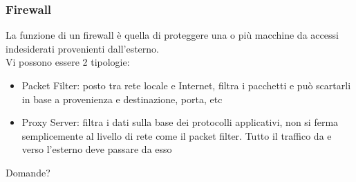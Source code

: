 \documentclass[aspectratio=169]{beamer}
\begin{document}
    \begin{frame}
        \frametitle{Firewall}
        La funzione di un firewall è quella di proteggere una o più macchine da accessi indesiderati provenienti dall'esterno.
        \\
        Vi possono essere 2 tipologie:
        \begin{itemize}
            \item Packet Filter: posto tra rete locale e Internet, filtra i pacchetti e può scartarli in base a provenienza e destinazione, porta, etc
            \item Proxy Server: filtra i dati sulla base dei protocolli applicativi, non si ferma semplicemente al livello di rete come il packet filter. Tutto il traffico da e verso l'esterno deve passare da esso
        \end{itemize}
    \end{frame}
    
	\startlayoutpage
	\begin{frame}
		\begin{center}
			\Huge Domande?
		\end{center}
	\end{frame}
	\stoplayoutpage
\end{document}
